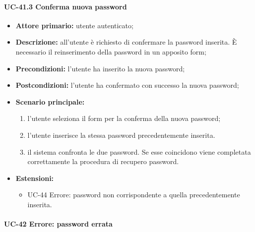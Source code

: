 \paragraph{UC-41.3 Conferma nuova password}

	\begin{itemize}
		\item \textbf{Attore primario:} utente autenticato;

		\item \textbf{Descrizione:} all'utente è richiesto di confermare la password inserita.  \`{E} necessario il reinserimento della password in un apposito form;

		\item \textbf{Precondizioni:} l'utente ha inserito la nuova password;

		\item \textbf{Postcondizioni:} l'utente ha confermato con successo la nuova password;

		\item \textbf{Scenario principale:}
	  		\begin{enumerate}
		  		\item l'utente seleziona il form per la conferma della nuova password;
		  		\item l'utente inserisce la stessa password precedentemente inserita.
		  		\item il sistema confronta le due password. Se esse coincidono viene completata correttamente la procedura di recupero password.
	  		\end{enumerate}
		\item \textbf{Estensioni:}
	  		\begin{itemize}
		  		\item UC-44 Errore: password non corrispondente a quella precedentemente inserita.
	  		\end{itemize}
	\end{itemize}

\paragraph{UC-42 Errore: password errata}


